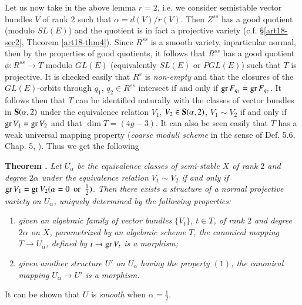 Let us now take in the above lemma $r=2$, i.e. we consider semi\-stable vector bundles $V$ of rank $2$ such that $\alpha=d(V)/r(V)$. Then $Z^{ss}$ has a good quotient (modulo $SL(E)$) and the quotient is in fact a projective variety (c.f. \S\ref{art18-sec2}, Theorem \ref{art18-thm4}). Since $R^{ss}$ is a smooth variety, in\pageoriginale particular normal, then by the properties of good quotients, it follows that $R^{ss}$ has a good quotient $\phi:R^{ss}\to T$ modulo $GL(E)$ (equivalently $SL(E)$ or $PGL(E)$) such that $T$ is projective. It is checked easily that $R^{s}$ is {\em non-empty} and that the closures of the $GL(E)$-orbits through $q_{1}$, $q_{2}\in R^{ss}$ intersect if and only if $\operatorname{\mathrm{gr}} F_{q_{1}}=\operatorname{\mathrm{gr}} F_{q_{2}}$. It follows then that $T$ can be identified naturally with the classes of vector bundles in $\mathbf{S}(\alpha,2)$ under the equivalence relation $V_{1}$, $V_{2}\in \mathbf{S}(\alpha,2)$, $V_{1}\sim V_{2}$ if and only if $\operatorname{\mathrm{gr}} V_{1}=\operatorname{\mathrm{gr}} V_{2}$ and that $\dim T=(4g-3)$. It can also be seen easily that $T$ has a weak universal mapping property ({\em coarse moduli scheme} in the sense of Def. 5.6, Chap. 5, \cite{art18-key4}). Thus we get the following

\medskip
\noindent
{\bf Theorem .\label{art18-thm5}}
{\em Let $U_{\alpha}$ be the equivalence classes of semi-stable $X$ of rank $2$ and degree $2\alpha$ under the equivalence relation $V_{1}\sim V_{2}$ if and only if $\operatorname{\mathrm{gr}} V_{1}=\operatorname{\mathrm{gr}} V_{2}(\alpha=0\text{~ or~ }\frac{1}{2})$. Then there exists a structure of a normal projective variety on $U_{\alpha}$, uniquely determined by the following properties:}
\begin{enumerate}
\renewcommand{\labelenumi}{\rm(\theenumi)}
\item {\em given an algebraic family of vector bundles $\{V_{t}\}$, $t\in T$, of rank $2$ and degree $2\alpha$ on $X$, parametrized by an algebraic scheme $T$, the canonical mapping $T\to U_{\alpha}$, defined by $t\to \operatorname{\mathrm{gr}} V_{t}$ is a morphism;}

\item {\em given another structure $U'$ on $U_{\alpha}$ having the property $(1)$, the canonical mapping $U_{\alpha}\to U'$ is a morphism.}
\end{enumerate}

\begin{remark*}
It can be shown that $U$ is {\em smooth} when $\alpha=\frac{1}{2}$.
\end{remark*}

